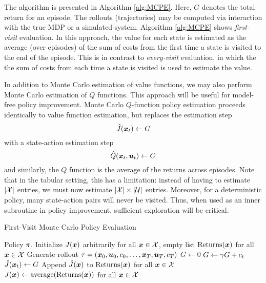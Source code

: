 The algorithm is presented in Algorithm \ref{alg:MCPE}. Here, $G$ denotes the total return for an episode. The rollouts (trajectories) may be computed via interaction with the true MDP or a simulated system. Algorithm \ref{alg:MCPE} shows \textit{first-visit} evaluation. In this approach, the value for each state is estimated as the average (over episodes) of the sum of costs from the first time a state is visited to the end of the episode. This is in contrast to \textit{every-visit} evaluation, in which the the sum of costs from each time a state is visited is used to estimate the value. 

In addition to Monte Carlo estimation of value functions, we may also perform Monte Carlo estimation of $Q$ functions. This approach will be useful for model-free policy improvement. Monte Carlo $Q$-function policy estimation proceeds identically to value function estimation, but replaces the estimation step 
\begin{equation}
    \hat{J}(\bm{x}_t) \gets G
\end{equation}
with a state-action estimation step
\begin{equation}
    \hat{Q}(\bm{x}_t, \bm{u}_t) \gets G
\end{equation}
and similarly, the $Q$ function is the average of the returns across episodes. Note that in the tabular setting, this has a limitation: instead of having to estimate $|\mathcal{X}|$ entries, we must now estimate $|\mathcal{X}| \times |\mathcal{U}|$ entries. Moreover, for a deterministic policy, many state-action pairs will never be visited. Thus, when used as an inner subroutine in policy improvement, sufficient exploration will be critical. 

\begin{algorithm}[t]
\caption{First-Visit Monte Carlo Policy Evaluation}
\centering
\label{alg:MCPE}

\begin{algorithmic}[1]
    \Require Policy $\pi$.
    \State Initialize $J(\bm{x})$ arbitrarily for all $\bm{x}\in \mathcal{X}$, empty list $\text{Returns}(\bm{x})$ for all $\bm{x} \in \mathcal{X}$
        \State Generate rollout $\tau = (\bm{x}_0, \bm{u}_0, c_0, \ldots, \bm{x}_T, \bm{u}_T, c_T)$
        \State $G \gets 0$
            \State $G \gets \gamma G + c_t$
            \State $\hat{J}(\bm{x}_t) \gets G$
        \EndFor
        \State Append $\hat{J}(\bm{x})$ to $\text{Returns}(\bm{x})$ for all $\bm{x} \in \mathcal{X}$
        \State $J(\bm{x}) \gets \text{average(Returns}(\bm{x}))$ for all $\bm{x} \in \mathcal{X}$
    \EndFor
\end{algorithmic}
\end{algorithm}


